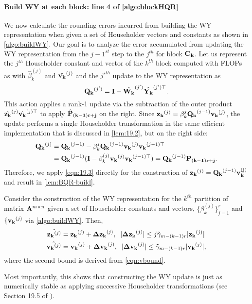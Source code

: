 \paragraph{Build WY at each block: line 4 of \cref{algo:blockHQR}}
We now calculate the rounding errors incurred from building the WY representation when given a set of Householder vectors and constants as shown in \cref{algo:buildWY}.
Our goal is to analyze the error accumulated from updating the WY representation from the $j-1^{st}$ step to the $j^{th}$ for block $\mathbf{C_k}$.
Let us represent the $j^{th}$ Householder constant and vector of the $k^{th}$ block computed with FLOPs as with $\hat{\beta}_k^{(j)}$ and $\hat{\mathbf{v_k}}^{(j)}$ and the $j'^{th}$ update to the WY representation as $$\mathbf{Q_k}^{(j')} = \mathbf{I} - \hat{\mathbf{W_k}}^{(j')}\hat{\mathbf{Y_k}}^{(j')\top}.$$ %
This action applies a rank-1 update via the subtraction of the outer product $\hat{\mathbf{z_k}}^{(j)}\hat{\mathbf{v_k}}^{(j)\top}$ to apply $\hat{\mathbf{P}}_{\mathbf{(k-1)r+j}}$ on the right. 
Since $\mathbf{z_k}^{(j)} = \beta_k^{j}\mathbf{Q_k}^{(j-1)}\mathbf{v_k}^{(j)}$, the update performs a single Householder transformation in the same efficient implementation that is discussed in \cref{lem:19.2}, but on the right side:
\begin{align*}
	\mathbf{Q_k}^{(j)} &= \mathbf{Q_k}^{(j-1)}-\beta_k^{j}\mathbf{Q_k}^{(j-1)}\mathbf{v_k}^{(j)}\mathbf{v_k}^{(j-1)\top} \\
	&= \mathbf{Q_k}^{(j-1)} (\mathbf{I}-\beta_k^{(j)}\mathbf{v_k}^{(j)}\mathbf{v_k}^{(j-1)\top})=  \mathbf{Q_k}^{(j-1)}\mathbf{P_{(k-1)r+j}}.
\end{align*}
Therefore, we apply \cref{eqn:19.3} directly for the construction of $\mathbf{z_k}^{(j)} = \mathbf{Q_k}^{(j-1)}\mathbf{v_k^{(j)}}$ and result in \cref{lem:BQR-build}.
\begin{lemma}\label{lem:BQR-build}
	Consider the construction of the WY representation for the $k^{th}$ partition of matrix $\mathbf{A}^{m\times n}$ given a set of Householder constants and vectors, $\{\beta_k^{(j)}\}_{j=1}^r$ and $\{\mathbf{v_k}^{(j)}$ via \cref{algo:buildWY}.
	Then, 
	\begin{align*}
		\hat{\mathbf{z_k}^{(j)}}& = \mathbf{z_k}^{(j)} + \mathbf{\Delta z_k}^{(j)},\;\; |\mathbf{\Delta z_k}^{(j)}| \leq j\tilde{\gamma}_{m-(k-1)r} |\mathbf{z_k}^{(j)}|\\
		\hat{\mathbf{v_k}^{(j)}}& = \mathbf{v_k}^{(j)} + \mathbf{\Delta v_k}^{(j)},\;\; |\mathbf{\Delta v_k}^{(j)}| \leq \tilde{\gamma}_{m-(k-1)r} |\mathbf{v_k}^{(j)}|,
	\end{align*}
	where the second bound is derived from \cref{eqn:vbound}.
\end{lemma}
Most importantly, this shows that constructing the WY update is just as numerically stable as applying successive Householder transformations (see Section 19.5 of \cite{Higham2002}).
